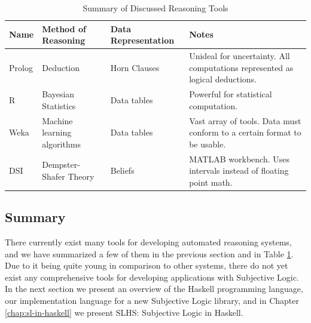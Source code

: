\documentclass[thesis.tex]{subfiles}
\begin{document}
\begin{table}
  \begin{center}
    \begin{tabularx}{\textwidth}{| l | l | l | X |}
      \hline
      Name & Method of Reasoning & Data Representation & Notes \\
      \hline
      Prolog                & Deduction                   & Horn Clauses & Unideal for uncertainty. All computations represented as logical deductions. \\
      \hline
      R                     & Bayesian Statistics         & Data tables  & Powerful for statistical computation.                                         \\
      \hline
      Weka                  & Machine learning algorithms & Data tables  & Vast array of tools. Data must conform to a certain format to be usable.     \\
      \hline
      DSI                   & Dempster-Shafer Theory      & Beliefs      & MATLAB workbench. Uses intervals instead of floating point math.             \\
      \hline
    \end{tabularx}
  \end{center}

  \caption{Summary of Discussed Reasoning Tools}
  \label{tbl:reasoning-tools}
\end{table}





%
%









\subsection{Summary}

There currently exist many tools for developing automated reasoning systems, and we have summarized a few
of them in the previous section and in Table \ref{tbl:reasoning-tools}.
Due to it being quite young in comparison to other systems, there do not yet exist any
comprehensive tools for developing applications with Subjective Logic. In the next section
we present an overview of the Haskell programming language, our implementation language for a new Subjective Logic
library, and in Chapter \ref{chap:sl-in-haskell} we present SLHS: Subjective Logic in Haskell.
\end{document}
